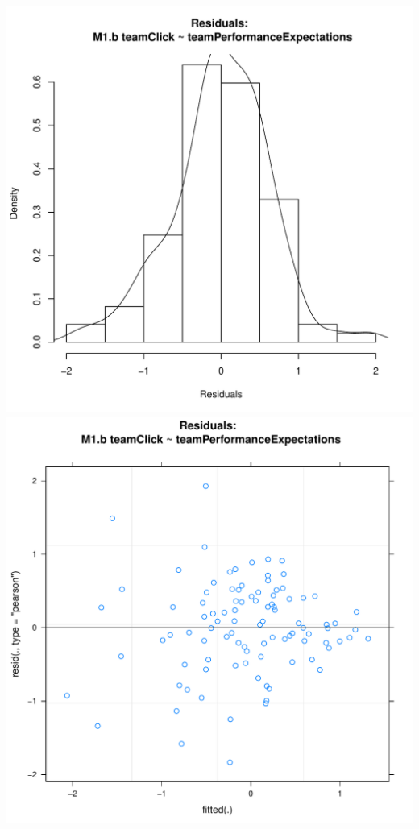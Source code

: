 \documentclass[12pt]{report}
\begin{document}
\centering
\newpage
\includegraphics[scale =.4]{../images/MLM1bHist.pdf}
\includegraphics[scale =.4]{../images/MLM1bScatter.pdf}
\end{document}
